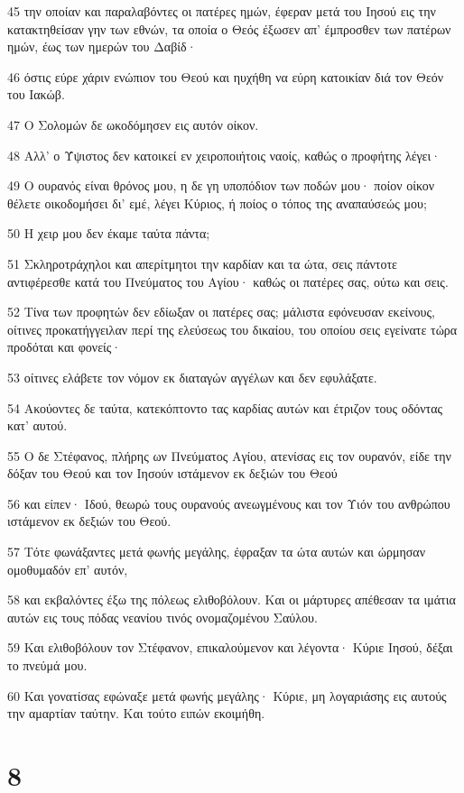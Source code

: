 \par 45 την οποίαν και παραλαβόντες οι πατέρες ημών, έφεραν μετά του Ιησού εις την κατακτηθείσαν γην των εθνών, τα οποία ο Θεός έξωσεν απ' έμπροσθεν των πατέρων ημών, έως των ημερών του Δαβίδ·
\par 46 όστις εύρε χάριν ενώπιον του Θεού και ηυχήθη να εύρη κατοικίαν διά τον Θεόν του Ιακώβ.
\par 47 Ο Σολομών δε ωκοδόμησεν εις αυτόν οίκον.
\par 48 Αλλ' ο Ύψιστος δεν κατοικεί εν χειροποιήτοις ναοίς, καθώς ο προφήτης λέγει·
\par 49 Ο ουρανός είναι θρόνος μου, η δε γη υποπόδιον των ποδών μου· ποίον οίκον θέλετε οικοδομήσει δι' εμέ, λέγει Κύριος, ή ποίος ο τόπος της αναπαύσεώς μου;
\par 50 Η χειρ μου δεν έκαμε ταύτα πάντα;
\par 51 Σκληροτράχηλοι και απερίτμητοι την καρδίαν και τα ώτα, σεις πάντοτε αντιφέρεσθε κατά του Πνεύματος του Αγίου· καθώς οι πατέρες σας, ούτω και σεις.
\par 52 Τίνα των προφητών δεν εδίωξαν οι πατέρες σας; μάλιστα εφόνευσαν εκείνους, οίτινες προκατήγγειλαν περί της ελεύσεως του δικαίου, του οποίου σεις εγείνατε τώρα προδόται και φονείς·
\par 53 οίτινες ελάβετε τον νόμον εκ διαταγών αγγέλων και δεν εφυλάξατε.
\par 54 Ακούοντες δε ταύτα, κατεκόπτοντο τας καρδίας αυτών και έτριζον τους οδόντας κατ' αυτού.
\par 55 Ο δε Στέφανος, πλήρης ων Πνεύματος Αγίου, ατενίσας εις τον ουρανόν, είδε την δόξαν του Θεού και τον Ιησούν ιστάμενον εκ δεξιών του Θεού
\par 56 και είπεν· Ιδού, θεωρώ τους ουρανούς ανεωγμένους και τον Υιόν του ανθρώπου ιστάμενον εκ δεξιών του Θεού.
\par 57 Τότε φωνάξαντες μετά φωνής μεγάλης, έφραξαν τα ώτα αυτών και ώρμησαν ομοθυμαδόν επ' αυτόν,
\par 58 και εκβαλόντες έξω της πόλεως ελιθοβόλουν. Και οι μάρτυρες απέθεσαν τα ιμάτια αυτών εις τους πόδας νεανίου τινός ονομαζομένου Σαύλου.
\par 59 Και ελιθοβόλουν τον Στέφανον, επικαλούμενον και λέγοντα· Κύριε Ιησού, δέξαι το πνεύμά μου.
\par 60 Και γονατίσας εφώναξε μετά φωνής μεγάλης· Κύριε, μη λογαριάσης εις αυτούς την αμαρτίαν ταύτην. Και τούτο ειπών εκοιμήθη.

\chapter{8}

